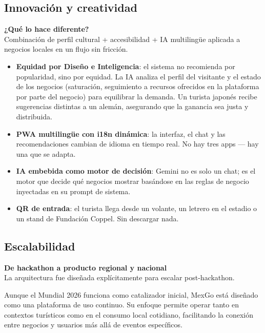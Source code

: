 \documentclass[11pt,a4paper]{article}
\newcommand{\criterio}[2]{
  \vspace{0.3cm}
  \noindent\colorbox{primary!10}{\parbox{\dimexpr\linewidth-2\fboxsep}{%
    \textbf{\textcolor{primary}{#1}}\\[2pt]
    \small\textcolor{dark}{#2}
  }}
  \vspace{0.3cm}
}
\begin{document}
\subsection{Innovación y creatividad}

\criterio{¿Qué lo hace diferente?}
{Combinación de perfil cultural + accesibilidad + IA multilingüe aplicada
a negocios locales en un flujo sin fricción.}

\begin{itemize}[leftmargin=*, itemsep=2pt]
  \item \textbf{Equidad por Diseño e Inteligencia}: el sistema no recomienda por popularidad,
        sino por equidad. La IA analiza el perfil del visitante y el estado de los negocios
        (saturación, seguimiento a recursos ofrecidos en la plataforma por parte del negocio) para equilibrar la demanda. Un turista
        japonés recibe sugerencias distintas a un alemán, asegurando que la ganancia
        sea justa y distribuida.
  \item \textbf{PWA multilingüe con i18n dinámica}: la interfaz, el chat y las
        recomendaciones cambian de idioma en tiempo real. No hay tres apps —
        hay una que se adapta.
  \item \textbf{IA embebida como motor de decisión}: Gemini no es solo un chat; es el
        motor que decide qué negocios mostrar basándose en las reglas de negocio
        inyectadas en su prompt de sistema.
  \item \textbf{QR de entrada}: el turista llega desde un volante, un letrero
        en el estadio o un stand de Fundación Coppel. Sin descargar nada.
\end{itemize}

\subsection{Escalabilidad}

\criterio{De hackathon a producto regional y nacional}
{La arquitectura fue diseñada explícitamente para escalar post-hackathon.}

Aunque el Mundial 2026 funciona como catalizador inicial, MexGo está diseñado como una plataforma de uso continuo. Su enfoque permite operar tanto en contextos turísticos como en el consumo local cotidiano, facilitando la conexión entre negocios y usuarios más allá de eventos específicos.
\end{document}
